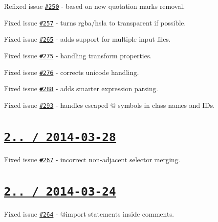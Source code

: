 \begin{DoxyItemize}
\item Refixed issue \href{https://github.com/jakubpawlowicz/clean-css/issues/250}{\tt \#250} -\/ based on new quotation marks removal.
\item Fixed issue \href{https://github.com/jakubpawlowicz/clean-css/issues/257}{\tt \#257} -\/ turns {\ttfamily rgba}/{\ttfamily hsla} to {\ttfamily transparent} if possible.
\item Fixed issue \href{https://github.com/jakubpawlowicz/clean-css/issues/265}{\tt \#265} -\/ adds support for multiple input files.
\item Fixed issue \href{https://github.com/jakubpawlowicz/clean-css/issues/275}{\tt \#275} -\/ handling transform properties.
\item Fixed issue \href{https://github.com/jakubpawlowicz/clean-css/issues/276}{\tt \#276} -\/ corrects unicode handling.
\item Fixed issue \href{https://github.com/jakubpawlowicz/clean-css/issues/288}{\tt \#288} -\/ adds smarter expression parsing.
\item Fixed issue \href{https://github.com/jakubpawlowicz/clean-css/issues/293}{\tt \#293} -\/ handles escaped {\ttfamily @} symbols in class names and I\+Ds.
\end{DoxyItemize}

\section*{\href{https://github.com/jakubpawlowicz/clean-css/compare/v2.1.7...v2.1.8}{\tt 2.. / 2014-\/03-\/28} }


\begin{DoxyItemize}
\item Fixed issue \href{https://github.com/jakubpawlowicz/clean-css/issues/267}{\tt \#267} -\/ incorrect non-\/adjacent selector merging.
\end{DoxyItemize}

\section*{\href{https://github.com/jakubpawlowicz/clean-css/compare/v2.1.6...v2.1.7}{\tt 2.. / 2014-\/03-\/24} }


\begin{DoxyItemize}
\item Fixed issue \href{https://github.com/jakubpawlowicz/clean-css/issues/264}{\tt \#264} -\/ {\ttfamily @import} statements inside comments.
\end{DoxyItemize}

